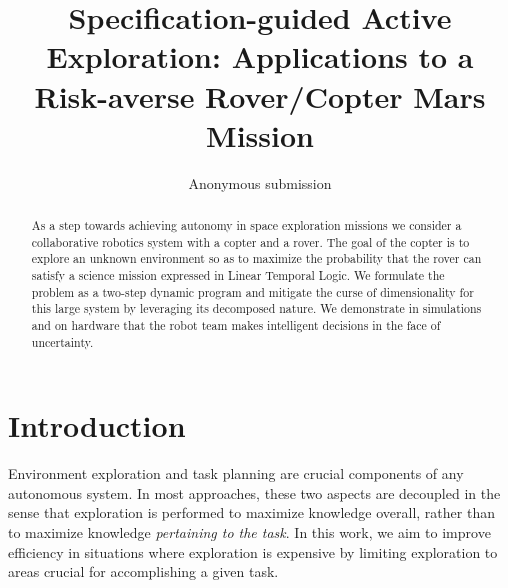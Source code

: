 \documentclass[conference]{IEEEtran}
\begin{document}



\title{\huge Specification-guided Active Exploration: Applications to a Risk-averse Rover/Copter Mars Mission}



\author{Anonymous submission}

\maketitle

\begin{abstract}
  As a step towards achieving autonomy in space exploration missions we consider a collaborative robotics system with a copter and a rover. The goal of the copter is to explore an unknown environment so as to maximize the probability that the rover can satisfy a science mission expressed in Linear Temporal Logic. We formulate the problem as a two-step dynamic program and mitigate the curse of dimensionality for this large system by leveraging its decomposed nature. We demonstrate in simulations and on hardware that the robot team makes intelligent decisions in the face of uncertainty.
\end{abstract}

\IEEEpeerreviewmaketitle

	

\section{Introduction}

Environment exploration and task planning are crucial components of any autonomous system. In most approaches, these two aspects are decoupled in the sense that exploration is performed to maximize knowledge overall, rather than to maximize knowledge \emph{pertaining to the task}. In this work, we aim to improve efficiency in situations where exploration is expensive by limiting exploration to areas crucial for accomplishing a given task. 
\end{document}
